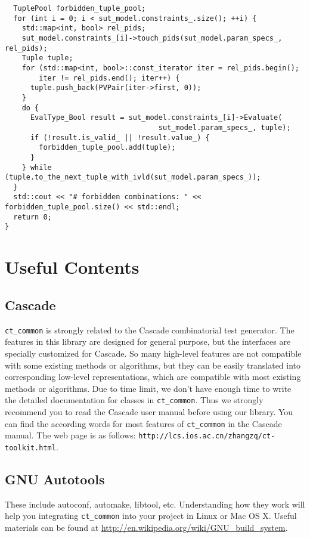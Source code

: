 \documentclass{article}
\begin{document}
{\begin{verbatim}
  TuplePool forbidden_tuple_pool;
  for (int i = 0; i < sut_model.constraints_.size(); ++i) {
    std::map<int, bool> rel_pids;
    sut_model.constraints_[i]->touch_pids(sut_model.param_specs_, rel_pids);
    Tuple tuple;
    for (std::map<int, bool>::const_iterator iter = rel_pids.begin();
        iter != rel_pids.end(); iter++) {
      tuple.push_back(PVPair(iter->first, 0));
    }
    do {
      EvalType_Bool result = sut_model.constraints_[i]->Evaluate(
                                    sut_model.param_specs_, tuple);
      if (!result.is_valid_ || !result.value_) {
        forbidden_tuple_pool.add(tuple);
      }
    } while (tuple.to_the_next_tuple_with_ivld(sut_model.param_specs_));
  }
  std::cout << "# forbidden combinations: " << forbidden_tuple_pool.size() << std::endl;
  return 0;
}
\end{verbatim}
}

\section{Useful Contents}
\subsection*{Cascade}
{\tt ct\_common} is strongly related to the Cascade combinatorial test generator.
The features in this library are designed for general purpose, but the interfaces
are specially customized for Cascade. So many high-level features are not compatible
with some existing methods or algorithms, but they can be easily translated into corresponding
low-level representations, which are compatible with most existing methods or algorithms.
Due to time limit, we don't have enough time to write the detailed documentation
for classes in {\tt ct\_common}. Thus we strongly recommend you to read the Cascade user manual
before using our library. You can find the according words for most
features of {\tt ct\_common} in the Cascade manual. The web page is as follows:
{\tt http://lcs.ios.ac.cn/\texttildelow zhangzq/ct-toolkit.html}.

\subsection*{GNU Autotools}
These include autoconf, automake, libtool, etc. Understanding how they work
will help you integrating {\tt ct\_common} into your project in Linux or Mac OS X.
Useful materials can be found at \url{http://en.wikipedia.org/wiki/GNU_build_system}.
\end{document}
